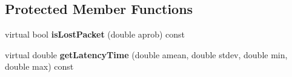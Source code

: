 \subsection*{Protected Member Functions}
\begin{DoxyCompactItemize}
\item 
virtual bool {\bfseries is\+Lost\+Packet} (double aprob) const \hypertarget{classV2XRandomBroker_a1585d45336d9d89c76eca3e9608e548f}{}\label{classV2XRandomBroker_a1585d45336d9d89c76eca3e9608e548f}

\item 
virtual double {\bfseries get\+Latency\+Time} (double amean, double stdev, double min, double max) const \hypertarget{classV2XRandomBroker_ad114e0d280c3c4900e0cc19d658c092a}{}\label{classV2XRandomBroker_ad114e0d280c3c4900e0cc19d658c092a}

\end{DoxyCompactItemize}
